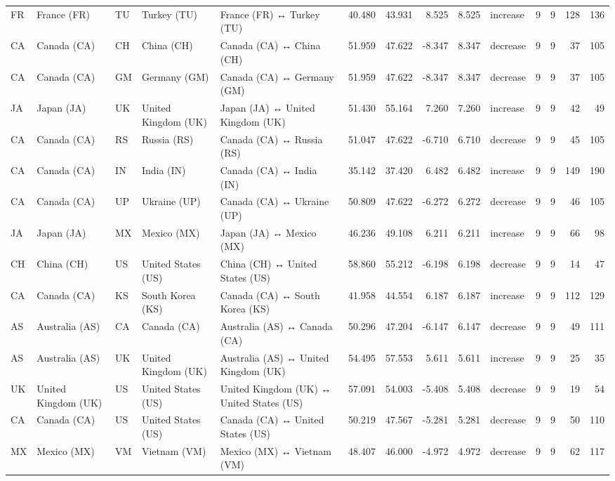 \begin{tabular}{lllllrrrrlrrrr}
FR & France (FR) & TU & Turkey (TU) & France (FR) ↔ Turkey (TU) & 40.480 & 43.931 & 8.525 & 8.525 & increase & 9 & 9 & 128 & 136 \\
CA & Canada (CA) & CH & China (CH) & Canada (CA) ↔ China (CH) & 51.959 & 47.622 & -8.347 & 8.347 & decrease & 9 & 9 & 37 & 105 \\
CA & Canada (CA) & GM & Germany (GM) & Canada (CA) ↔ Germany (GM) & 51.959 & 47.622 & -8.347 & 8.347 & decrease & 9 & 9 & 37 & 105 \\
JA & Japan (JA) & UK & United Kingdom (UK) & Japan (JA) ↔ United Kingdom (UK) & 51.430 & 55.164 & 7.260 & 7.260 & increase & 9 & 9 & 42 & 49 \\
CA & Canada (CA) & RS & Russia (RS) & Canada (CA) ↔ Russia (RS) & 51.047 & 47.622 & -6.710 & 6.710 & decrease & 9 & 9 & 45 & 105 \\
CA & Canada (CA) & IN & India (IN) & Canada (CA) ↔ India (IN) & 35.142 & 37.420 & 6.482 & 6.482 & increase & 9 & 9 & 149 & 190 \\
CA & Canada (CA) & UP & Ukraine (UP) & Canada (CA) ↔ Ukraine (UP) & 50.809 & 47.622 & -6.272 & 6.272 & decrease & 9 & 9 & 46 & 105 \\
JA & Japan (JA) & MX & Mexico (MX) & Japan (JA) ↔ Mexico (MX) & 46.236 & 49.108 & 6.211 & 6.211 & increase & 9 & 9 & 66 & 98 \\
CH & China (CH) & US & United States (US) & China (CH) ↔ United States (US) & 58.860 & 55.212 & -6.198 & 6.198 & decrease & 9 & 9 & 14 & 47 \\
CA & Canada (CA) & KS & South Korea (KS) & Canada (CA) ↔ South Korea (KS) & 41.958 & 44.554 & 6.187 & 6.187 & increase & 9 & 9 & 112 & 129 \\
AS & Australia (AS) & CA & Canada (CA) & Australia (AS) ↔ Canada (CA) & 50.296 & 47.204 & -6.147 & 6.147 & decrease & 9 & 9 & 49 & 111 \\
AS & Australia (AS) & UK & United Kingdom (UK) & Australia (AS) ↔ United Kingdom (UK) & 54.495 & 57.553 & 5.611 & 5.611 & increase & 9 & 9 & 25 & 35 \\
UK & United Kingdom (UK) & US & United States (US) & United Kingdom (UK) ↔ United States (US) & 57.091 & 54.003 & -5.408 & 5.408 & decrease & 9 & 9 & 19 & 54 \\
CA & Canada (CA) & US & United States (US) & Canada (CA) ↔ United States (US) & 50.219 & 47.567 & -5.281 & 5.281 & decrease & 9 & 9 & 50 & 110 \\
MX & Mexico (MX) & VM & Vietnam (VM) & Mexico (MX) ↔ Vietnam (VM) & 48.407 & 46.000 & -4.972 & 4.972 & decrease & 9 & 9 & 62 & 117 \\

\end{tabular}
